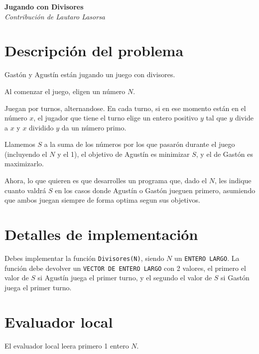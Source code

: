 \documentclass[fontsize=13pt, paper=a4, DIV=calc]{scrartcl}
\renewcommand*{\maketitle}{
	\begin{center}
		\textbf{\nombre}\\
		\textit{\footnotesize Contribución de \author}
	\end{center}
}
\begin{document}
\def\contest{OIA Certamen Nacional Nivel 2}
\def\nombre{Jugando con Divisores}
\def\author{Lautaro Lasorsa}
\def\niveldia{}
\def\numero{}
\def\archivo{divisores}%
\def\version{}


\maketitle
\begin{multicols*}{2}

\section{Descripción del problema}

Gastón y Agustín están jugando un juego con divisores.

Al comenzar el juego, eligen un número $N$. 

Juegan por turnos, alternandose. En cada turno, si en ese momento están en el número $x$, el jugador que tiene el turno elige un entero positivo $y$ tal que $y$ divide a $x$ y $x$ dividido $y$ da un número primo.

Llamemos $S$ a la suma de los números por los que pasarón durante el juego (incluyendo el $N$ y el 1), el objetivo de Agustín es minimizar $S$, y el de Gastón es maximizarlo.

Ahora, lo que quieren es que desarrolles un programa que, dado el $N$, les indique cuanto valdrá $S$ en los casos donde Agustín o Gastón jueguen primero, asumiendo que ambos juegan siempre de forma optima segun sus objetivos.

\section{Detalles de implementación}
Debes implementar la función \texttt{Divisores(N)}, siendo $N$ un \texttt{ENTERO LARGO}. La función debe devolver un \texttt{VECTOR DE ENTERO LARGO} con 2 valores, el primero el valor de $S$ si Agustín juega el primer turno, y el segundo el valor de $S$ si Gastón juega el primer turno.

\section{Evaluador local}
El evaluador local leera primero 1 entero $N$.


\end{multicols*}
\end{document}
